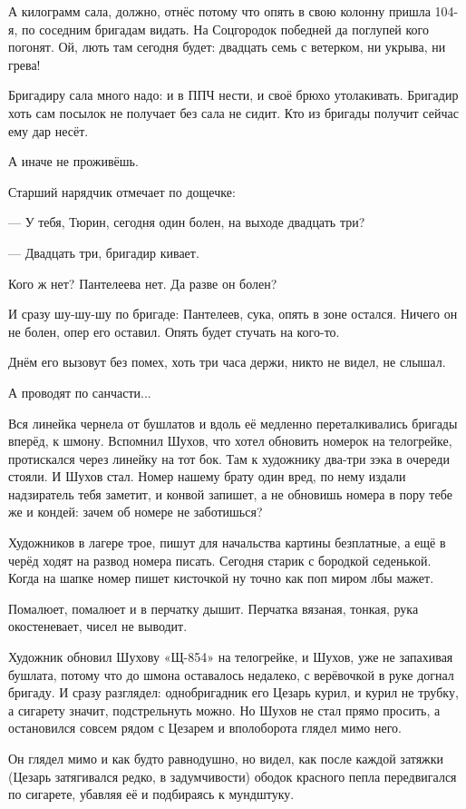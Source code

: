 А килограмм сала, должно, отнёс \dash потому что опять в свою колонну пришла 104-я, по соседним
бригадам видать. На Соцгородок победней да поглупей кого погонят. Ой, лють там сегодня будет:
двадцать семь с ветерком, ни укрыва, ни грева!

Бригадиру сала много надо: и в ППЧ нести, и своё брюхо утолакивать. Бригадир хоть сам посылок
не получает \dash без сала не сидит. Кто из бригады получит \dash сейчас ему дар несёт.

А иначе не проживёшь.

Старший нарядчик отмечает по дощечке:

--- У тебя, Тюрин, сегодня один болен, на выходе двадцать три?

--- Двадцать три, \dash бригадир кивает.

Кого ж нет? Пантелеева нет. Да разве он болен?

И сразу шу-шу-шу по бригаде: Пантелеев, сука, опять в зоне остался. Ничего он не болен, опер его
оставил. Опять будет стучать на кого-то.

Днём его вызовут без помех, хоть три часа держи, никто не видел, не слышал.

А проводят по санчасти...

Вся линейка чернела от бушлатов \dash и вдоль её медленно переталкивались бригады вперёд, к
шмону. Вспомнил Шухов, что хотел обновить номерок на телогрейке, протискался через линейку
на тот бок. Там к художнику два-три зэка в очереди стояли. И Шухов стал. Номер нашему брату \dash
один вред, по нему издали надзиратель тебя заметит, и конвой запишет, а не обновишь номера в
пору \dash тебе же и кондей: зачем об номере не заботишься?

Художников в лагере трое, пишут для начальства картины безплатные, а ещё в черёд ходят на
развод номера писать. Сегодня старик с бородкой седенькой. Когда на шапке номер пишет
кисточкой \dash ну точно как поп миром лбы мажет.

Помалюет, помалюет и в перчатку дышит. Перчатка вязаная, тонкая, рука окостеневает, чисел не
выводит.

Художник обновил Шухову «Щ-854» на телогрейке, и Шухов, уже не запахивая бушлата, потому что до
шмона оставалось недалеко, с верёвочкой в руке догнал бригаду. И сразу разглядел:
однобригадник его Цезарь курил, и курил не трубку, а сигарету \dash значит, подстрельнуть можно.
Но Шухов не стал прямо просить, а остановился совсем рядом с Цезарем и вполоборота глядел
мимо него.

Он глядел мимо и как будто равнодушно, но видел, как после каждой затяжки (Цезарь затягивался
редко, в задумчивости) ободок красного пепла передвигался по сигарете, убавляя её и
подбираясь к мундштуку.


